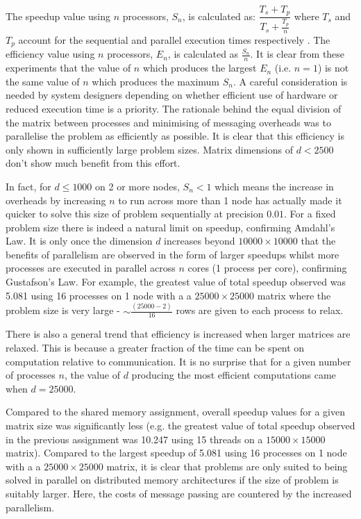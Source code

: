 \documentclass[11pt]{article}
\begin{document}
The speedup value using $n$ processors, $S_{n}$, is calculated as: $\dfrac{T_{s}+T_{p}}{T_{s}+\frac{T_{p}}{n}}$ where $T_{s}$ and $T_{p}$ account for the sequential and parallel execution times respectively \cite{gustafson1988}. The efficiency value using $n$ processors, $E_{n}$, is calculated as $\frac{S_{n}}{n}$. It is clear from these experiments that the value of $n$ which produces the largest $E_{n}$ (i.e. $n=1$) is not the same value of $n$ which produces the maximum $S_{n}$. A careful consideration is needed by system designers depending on whether efficient use of hardware or reduced execution time is a priority.  The rationale behind the equal division of the matrix between processes and minimising of messaging overheads was to parallelise the problem as efficiently as possible. It is clear that this efficiency is only shown in sufficiently large problem sizes.  Matrix dimensions of $d<2500$ don't show much benefit from this effort. 

In fact, for $d\leq1000$ on 2 or more nodes, $S_{n}<1$ which means the increase in overheads by increasing $n$ to run across more than 1 node has actually made it quicker to solve this size of problem sequentially at precision $0.01$. For a fixed problem size there is indeed a natural limit on speedup, confirming Amdahl's Law. It is only once the dimension $d$ increases beyond $10000\times10000$ that the benefits of parallelism are observed in the form of larger speedups whilst more processes are executed in parallel across $n$ cores (1 process per core), confirming Gustafson's Law. For example, the greatest value of total speedup observed was 5.081 using 16 processes on 1 node with a a $25000\times25000$ matrix where the problem size is very large - $\sim \frac{(25000-2)}{16}$ rows are given to each process to relax.

There is also a general trend that efficiency is increased when larger matrices are relaxed. This is because a greater fraction of the time can be spent on computation relative to communication. It is no surprise that for a given number of processes $n$, the value of $d$ producing the most efficient computations came when $d=25000$.

Compared to the shared memory assignment, overall speedup values for a given matrix size was significantly less (e.g. the greatest value of total speedup observed in the previous assignment was 10.247 using 15 threads on a $15000\times15000$ matrix). Compared to the largest speedup of 5.081 using 16 processes on 1 node with a a $25000\times25000$ matrix, it is clear that problems are only suited to being solved in parallel on distributed memory architectures if the size of problem is suitably larger. Here, the costs of message passing are countered by the increased parallelism.
\end{document}
